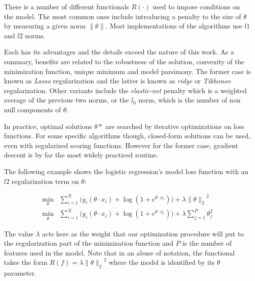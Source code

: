 There is a number of different functionals $R(\cdot)$ used to impose conditions on the model. The most common ones include introducing a penalty to the size of $\theta$ by measuring a given norm $\| \theta \|$. Most implementations of the algorithms use $l1$ and $l2$ norms.

Each has its advantages and the details exceed the nature of this work. As a summary, benefits are related to the robustness of the solution, convexity of the minimization function, unique minimum and model parsimony. The former case is known as \textit{ Lasso} regularization and the latter is known as \textit{ridge} or \textit{Tikhonov} regularization. Other variants include the \textit{elastic-net} penalty which is a weighted average of the previous two norms, or the $l_0$ norm, which is the number of non null components of $\theta$.


In practice, optimal solutions $\theta*$ are searched by iterative optimizations on loss functions.
For some specific algorithms though, closed-form solutions can be used, even with regularized scoring functions.
However for the former case, gradient descent is by far the most widely practiced routine.

The following example shows the logistic regression's model loss function with an $l2$ regularization term on $\theta$:

\begin{equation}\label{eq:logitRegularization}
\begin{split}
\min_{\theta} & \sum_{i=1}^N \big(y_i ( \theta \cdot x_i ) + \log(1 + e^{\theta \cdot x_i} ) \big) + \lambda { \| \theta \|_{2}}^2 \\
\min_{\theta} & \sum_{i=1}^N \big(y_i ( \theta \cdot x_i ) + \log(1 + e^{\theta \cdot x_i} ) \big) + \lambda \sum_{j=1}^P \theta_j^2
\end{split}
\end{equation}


%


The value $\lambda$ acts here as the weight that our optimization procedure will put to the regularization part of the minimization function and $P$ is the number of features used in the model. Note that in an abuse of notation, the functional takes the form $R(f) = \lambda { \| \theta \|_{2}}^2$ where the model is identified by its $\theta$ parameter.

